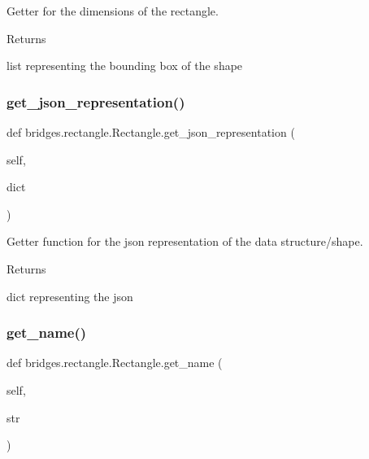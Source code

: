 Getter for the dimensions of the rectangle. 

\begin{DoxyReturn}{Returns}


list representing the bounding box of the shape 
\end{DoxyReturn}
\mbox{\label{classbridges_1_1rectangle_1_1_rectangle_abed807aa2b797312357395f874577a64}} 
\subsubsection{\texorpdfstring{get\+\_\+json\+\_\+representation()}{get\_json\_representation()}}
{\footnotesize\ttfamily def bridges.\+rectangle.\+Rectangle.\+get\+\_\+json\+\_\+representation (\begin{DoxyParamCaption}\item[{}]{self,  }\item[{}]{dict }\end{DoxyParamCaption})}



Getter function for the json representation of the data structure/shape. 

\begin{DoxyReturn}{Returns}


dict representing the json 
\end{DoxyReturn}
\mbox{\label{classbridges_1_1rectangle_1_1_rectangle_aad74ee17feb376967249296d34dfcb74}} 
\subsubsection{\texorpdfstring{get\+\_\+name()}{get\_name()}}
{\footnotesize\ttfamily def bridges.\+rectangle.\+Rectangle.\+get\+\_\+name (\begin{DoxyParamCaption}\item[{}]{self,  }\item[{}]{str }\end{DoxyParamCaption})}



